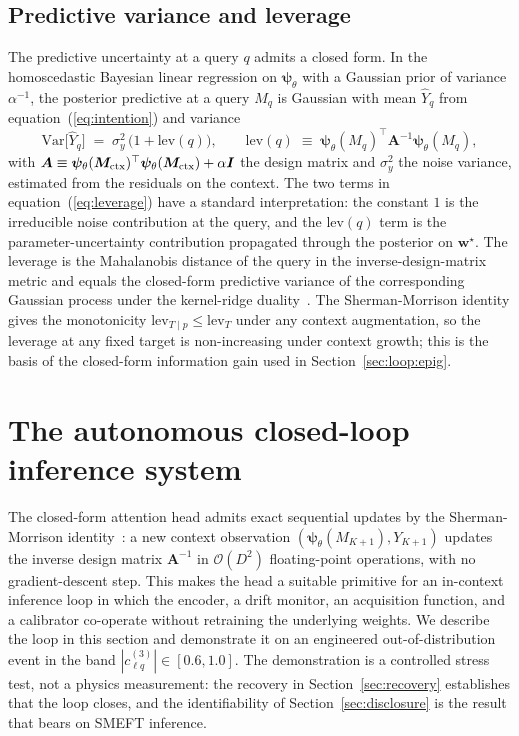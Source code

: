 \documentclass[11pt,a4paper]{article}
\newcommand{\Ainv}{\bm{A}^{-1}}
\newcommand{\psib}{\bm{\psi}}
\begin{document}
\subsection{Predictive variance and leverage}
\label{sec:variance}

The predictive uncertainty at a query $q$ admits a closed form. In the homoscedastic Bayesian linear regression on $\psib_\theta$ with a Gaussian prior of variance $\alpha^{-1}$, the posterior predictive at a query $M_q$ is Gaussian with mean $\hat{Y}_q$ from equation~(\ref{eq:intention}) and variance
\begin{equation}
  \mathrm{Var}\bigl[\hat{Y}_q\bigr] \;=\; \sigma_y^2 \,\bigl(1 + \mathrm{lev}(q)\bigr), \qquad \mathrm{lev}(q) \;\equiv\; \psib_\theta(M_q)^\top \bm{A}^{-1} \psib_\theta(M_q),
  \label{eq:leverage}
\end{equation}
with $\bm{A} \equiv \psib_\theta(\bm{M}_{\rm ctx})^\top \psib_\theta(\bm{M}_{\rm ctx}) + \alpha \bm{I}$ the design matrix and $\sigma_y^2$ the noise variance, estimated from the residuals on the context. The two terms in equation~(\ref{eq:leverage}) have a standard interpretation: the constant $1$ is the irreducible noise contribution at the query, and the $\mathrm{lev}(q)$ term is the parameter-uncertainty contribution propagated through the posterior on $\bm{w}^\star$. The leverage is the Mahalanobis distance of the query in the inverse-design-matrix metric and equals the closed-form predictive variance of the corresponding Gaussian process under the kernel-ridge duality~\cite{Rasmussen:2006gp}. The Sherman-Morrison identity gives the monotonicity $\mathrm{lev}_{T \mid p} \leq \mathrm{lev}_T$ under any context augmentation, so the leverage at any fixed target is non-increasing under context growth; this is the basis of the closed-form information gain used in Section~\ref{sec:loop:epig}.

\section{The autonomous closed-loop inference system}
\label{sec:loop}

The closed-form attention head admits exact sequential updates by the Sherman-Morrison identity~\cite{Sherman:1950}: a new context observation $(\psib_\theta(M_{K+1}), Y_{K+1})$ updates the inverse design matrix $\Ainv$ in $\mathcal{O}(D^2)$ floating-point operations, with no gradient-descent step. This makes the head a suitable primitive for an in-context inference loop in which the encoder, a drift monitor, an acquisition function, and a calibrator co-operate without retraining the underlying weights. We describe the loop in this section and demonstrate it on an engineered out-of-distribution event in the band $|c_{\ell q}^{(3)}| \in [0.6, 1.0]$. The demonstration is a controlled stress test, not a physics measurement: the recovery in Section~\ref{sec:recovery} establishes that the loop closes, and the identifiability of Section~\ref{sec:disclosure} is the result that bears on SMEFT inference.
\end{document}

